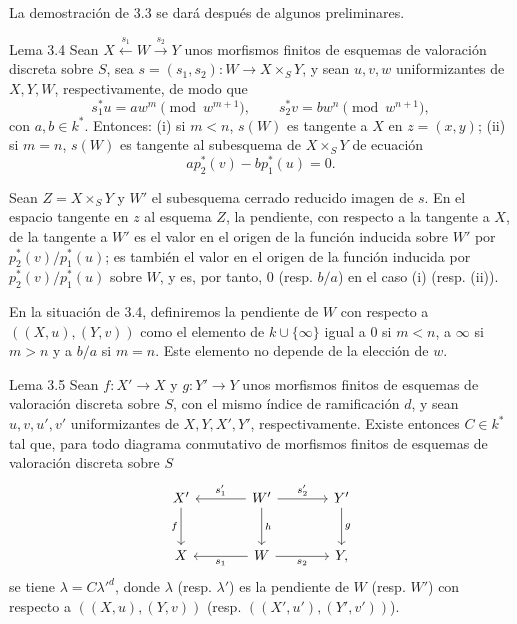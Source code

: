 La demostración de 3.3 se dará después de algunos preliminares.

\begin{statement}{Lema 3.4}
Sean $X\xleftarrow{s_1}W\xrightarrow{s_2}Y$ unos morfismos finitos de esquemas de valoración discreta sobre $S$, sea $s=(s_1,s_2):W\to X\times_SY$, y sean $u,v,w$ uniformizantes de $X,Y,W$, respectivamente, de modo que
\[
s_1^*u=aw^m\pmod {w^{m+1}},\qquad
s_2^*v=bw^n\pmod {w^{n+1}},
\]
con $a,b\in k^*$. Entonces: (i) si $m<n$, $s(W)$ es tangente a $X$ en $z=(x,y)$; (ii) si $m=n$, $s(W)$ es tangente al subesquema de $X\times_SY$ de ecuación
\[
ap_2^*(v)-bp_1^*(u)=0.
\]
\end{statement}

Sean $Z=X\times_SY$ y $W'$ el subesquema cerrado reducido imagen de $s$. En el espacio tangente en $z$ al esquema $Z$, la pendiente, con respecto a la tangente a $X$, de la tangente a $W'$ es el valor en el origen de la función inducida sobre $W'$ por $p_2^*(v)/p_1^*(u)$; es también el valor en el origen de la función inducida por $p_2^*(v)/p_1^*(u)$ sobre $W$, y es, por tanto, $0$ (resp. $b/a$) en el caso (i) (resp. (ii)).

En la situación de 3.4, definiremos la pendiente de $W$ con respecto a $((X,u),(Y,v))$ como el elemento de $k\cup\{\infty\}$ igual a $0$ si $m<n$, a $\infty$ si $m>n$ y a $b/a$ si $m=n$. Este elemento no depende de la elección de $w$.

\begin{statement}{Lema 3.5}
Sean $f:X'\to X$ y $g:Y'\to Y$ unos morfismos finitos de esquemas de valoración discreta sobre $S$, con el mismo índice de ramificación $d$, y sean $u,v,u',v'$ uniformizantes de $X,Y,X',Y'$, respectivamente. Existe entonces $C\in k^*$ tal que, para todo diagrama conmutativo de morfismos finitos de esquemas de valoración discreta sobre $S$
\[
\begin{tikzcd}[column sep=large,row sep=large]
X' \arrow[d,"f"'] & W' \arrow[l,"s'_1"'] \arrow[r,"s'_2"] \arrow[d,"h"] & Y' \arrow[d,"g"]\\
X & W \arrow[l,"s_1"] \arrow[r,"s_2"'] & Y ,
\end{tikzcd}
\]
se tiene $\lambda=C{\lambda'}^d$, donde $\lambda$ (resp. $\lambda'$) es la pendiente de $W$ (resp. $W'$) con respecto a $((X,u),(Y,v))$ (resp. $((X',u'),(Y',v'))$).
\end{statement}

